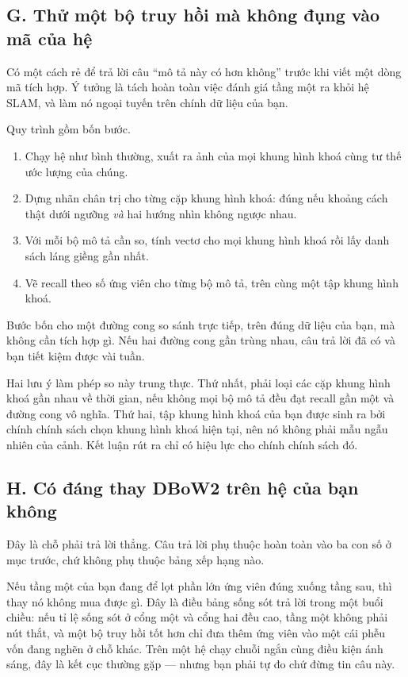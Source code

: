 \documentclass[../../deep_learning.tex]{subfiles}
\begin{document}
\subsection{G. Thử một bộ truy hồi mà không đụng vào mã của hệ}
Có một cách rẻ để trả lời câu ``mô tả này có hơn không'' trước khi viết một dòng mã tích hợp. Ý tưởng là tách hoàn toàn việc đánh giá tầng một ra khỏi hệ SLAM, và làm nó ngoại tuyến trên chính dữ liệu của bạn.

Quy trình gồm bốn bước.

\begin{enumerate}
\item Chạy hệ như bình thường, xuất ra ảnh của mọi khung hình khoá cùng tư thế ước lượng của chúng.
\item Dựng nhãn chân trị cho từng cặp khung hình khoá: đúng nếu khoảng cách thật dưới ngưỡng \emph{và} hai hướng nhìn không ngược nhau.
\item Với mỗi bộ mô tả cần so, tính vectơ cho mọi khung hình khoá rồi lấy danh sách láng giềng gần nhất.
\item Vẽ recall theo số ứng viên cho từng bộ mô tả, trên cùng một tập khung hình khoá.
\end{enumerate}

Bước bốn cho một đường cong so sánh trực tiếp, trên đúng dữ liệu của bạn, mà không cần tích hợp gì. Nếu hai đường cong gần trùng nhau, câu trả lời đã có và bạn tiết kiệm được vài tuần.

Hai lưu ý làm phép so này trung thực. Thứ nhất, phải loại các cặp khung hình khoá gần nhau về thời gian, nếu không mọi bộ mô tả đều đạt recall gần một và đường cong vô nghĩa. Thứ hai, tập khung hình khoá của bạn được sinh ra bởi chính chính sách chọn khung hình khoá hiện tại, nên nó không phải mẫu ngẫu nhiên của cảnh. Kết luận rút ra chỉ có hiệu lực cho chính chính sách đó.

\subsection{H. Có đáng thay DBoW2 trên hệ của bạn không}
Đây là chỗ phải trả lời thẳng. Câu trả lời phụ thuộc hoàn toàn vào ba con số ở mục trước, chứ không phụ thuộc bảng xếp hạng nào.

Nếu tầng một của bạn đang để lọt phần lớn ứng viên đúng xuống tầng sau, thì thay nó không mua được gì. Đây là điều bảng sống sót trả lời trong một buổi chiều: nếu tỉ lệ sống sót ở cổng một và cổng hai đều cao, tầng một không phải nút thắt, và một bộ truy hồi tốt hơn chỉ đưa thêm ứng viên vào một cái phễu vốn đang nghẽn ở chỗ khác. Trên một hệ chạy chuỗi ngắn cùng điều kiện ánh sáng, đây là kết cục thường gặp --- nhưng bạn phải tự đo chứ đừng tin câu này.
\end{document}
